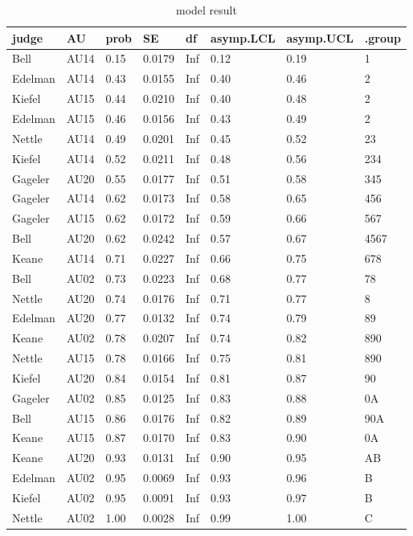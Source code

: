 \documentclass{monashthesis}
\begin{document}
\begin{table}[ht]
\begin{center}
\caption{\label{tab:result_1} model result}
\begin{tabular}{llllllll}
\toprule
judge & AU & prob & SE & df & asymp.LCL & asymp.UCL & .group \\
\midrule
Bell & AU14 & 0.15 & 0.0179 & Inf & 0.12 & 0.19 &  1             \\
Edelman & AU14 & 0.43 & 0.0155 & Inf & 0.40 & 0.46 &   2            \\
Kiefel & AU15 & 0.44 & 0.0210 & Inf & 0.40 & 0.48 &   2            \\
Edelman & AU15 & 0.46 & 0.0156 & Inf & 0.43 & 0.49 &   2            \\
Nettle & AU14 & 0.49 & 0.0201 & Inf & 0.45 & 0.52 &   23           \\
Kiefel & AU14 & 0.52 & 0.0211 & Inf & 0.48 & 0.56 &   234          \\
Gageler & AU20 & 0.55 & 0.0177 & Inf & 0.51 & 0.58 &    345         \\
Gageler & AU14 & 0.62 & 0.0173 & Inf & 0.58 & 0.65 &     456        \\
Gageler & AU15 & 0.62 & 0.0172 & Inf & 0.59 & 0.66 &      567       \\
Bell & AU20 & 0.62 & 0.0242 & Inf & 0.57 & 0.67 &     4567       \\
Keane & AU14 & 0.71 & 0.0227 & Inf & 0.66 & 0.75 &       678      \\
Bell & AU02 & 0.73 & 0.0223 & Inf & 0.68 & 0.77 &        78      \\
Nettle & AU20 & 0.74 & 0.0176 & Inf & 0.71 & 0.77 &         8      \\
Edelman & AU20 & 0.77 & 0.0132 & Inf & 0.74 & 0.79 &         89     \\
Keane & AU02 & 0.78 & 0.0207 & Inf & 0.74 & 0.82 &         890    \\
Nettle & AU15 & 0.78 & 0.0166 & Inf & 0.75 & 0.81 &         890    \\
Kiefel & AU20 & 0.84 & 0.0154 & Inf & 0.81 & 0.87 &          90    \\
Gageler & AU02 & 0.85 & 0.0125 & Inf & 0.83 & 0.88 &           0A   \\
Bell & AU15 & 0.86 & 0.0176 & Inf & 0.82 & 0.89 &          90A   \\
Keane & AU15 & 0.87 & 0.0170 & Inf & 0.83 & 0.90 &           0A   \\
Keane & AU20 & 0.93 & 0.0131 & Inf & 0.90 & 0.95 &            AB  \\
Edelman & AU02 & 0.95 & 0.0069 & Inf & 0.93 & 0.96 &             B  \\
Kiefel & AU02 & 0.95 & 0.0091 & Inf & 0.93 & 0.97 &             B  \\
Nettle & AU02 & 1.00 & 0.0028 & Inf & 0.99 & 1.00 &              C \\
\bottomrule
\end{tabular}
\end{center}
\end{table}
\end{document}
